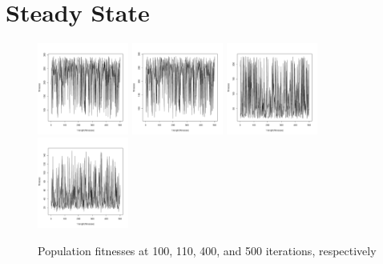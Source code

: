 \documentclass[12pt]{article}
\begin{document}
\section{Steady State}
\begin{figure}[!h]
        \begin{center}
		\includegraphics[width=30mm]{images/ss/ind_101.pdf}
		\includegraphics[width=30mm]{images/ss/ind_110.pdf}
		\includegraphics[width=30mm]{images/ss/ind_404.pdf}
		\includegraphics[width=30mm]{images/ss/ind_505.pdf}
               	\caption{Population fitnesses at 100, 110, 400, and 500 iterations, respectively}
                \label{ss_pop_fit}
        \end{center}
\end{figure}
\end{document}
